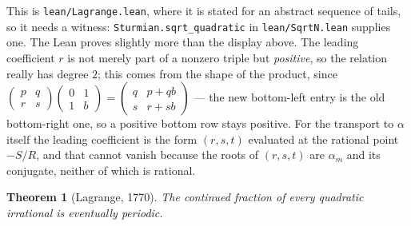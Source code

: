 \documentclass[11pt,a4paper]{article}
\theoremstyle{definition}
\theoremstyle{plain}
\newtheorem{theorem}[definition]{Theorem}
\begin{document}
This is \texttt{lean/Lagrange.lean}, where it is stated for an abstract
sequence of tails, so it needs a witness: \texttt{Sturmian.sqrt\_quadratic} in
\texttt{lean/SqrtN.lean} supplies one. The Lean proves slightly more than the
display above. The leading coefficient $r$ is not merely part of a nonzero
triple but \emph{positive}, so the relation really has degree $2$; this comes
from the shape of the product, since
$\left(\begin{smallmatrix}p&q\\r&s\end{smallmatrix}\right)
\left(\begin{smallmatrix}0&1\\1&b\end{smallmatrix}\right) =
\left(\begin{smallmatrix}q&p+qb\\s&r+sb\end{smallmatrix}\right)$ --- the new
bottom-left entry is the old bottom-right one, so a positive bottom row stays
positive. For the transport to $\alpha$ itself the leading coefficient is the
form $(r,s,t)$ evaluated at the rational point $-S/R$, and that cannot vanish
because the roots of $(r,s,t)$ are $\alpha_m$ and its conjugate, neither of
which is rational.

\begin{theorem}[Lagrange, 1770]\label{thm:lagrange1770}
The continued fraction of every quadratic irrational is eventually periodic.
\end{theorem}
\end{document}
